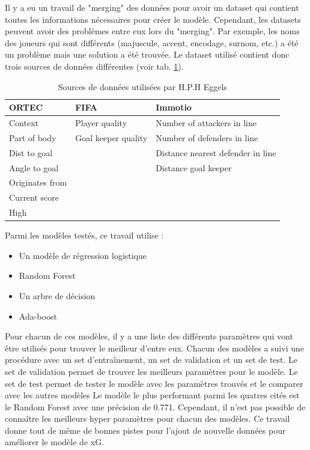 \documentclass[12pt]{article}
\begin{document}
Il y a eu un travail de "merging" des données pour avoir un dataset qui contient toutes les informations nécessaires pour créer le modèle. 
Cependant, les datasets peuvent avoir des problèmes entre eux lors du "merging". 
Par exemple, les noms des joueurs qui sont différents (majuscule, accent, encodage, surnom, etc.) a été un problème mais une solution a été trouvée.
\newline
Le dataset utilisé contient donc trois sources de données différentes (voir tab. \ref{tab:data_from_eggels}).
\begin{table}[htp]
    \centering
    \begin{tabular}{lll}
    \hline
    \textbf{ORTEC}  & \textbf{FIFA}       & \textbf{Immotio}                  \\ \hline
    Context         & Player quality      & Number of attackers in line       \\
    Part of body    & Goal keeper quality & Number of defenders in line       \\
    Dist to goal    &                     & Distance nearest defender in line \\
    Angle to goal   &                     & Distance goal keeper              \\
    Originates from &                     &                                   \\
    Current score   &                     &                                   \\
    High            &                     &                                   \\ \hline
    \end{tabular}
    \caption{Sources de données utilisées par H.P.H Eggels}
    \label{tab:data_from_eggels}
\end{table}
\newpage
Parmi les modèles testés, ce travail utilise :
\begin{itemize}
    \item Un modèle de régression logistique
    \item Random Forest
    \item Un arbre de décision
    \item Ada-boost
\end{itemize}
Pour chacun de ces modèles, il y a une liste des différents paramètres qui vont être utilisés pour trouver le meilleur d'entre eux.
Chacun des modèles a suivi une procédure avec un set d'entraînement, un set de validation et un set de test.
Le set de validation permet de trouver les meilleurs paramètres pour le modèle.
Le set de test permet de tester le modèle avec les paramètres trouvés et le comparer avec les autres modèles
Le modèle le plus performant parmi les quatres cités est le Random Forest avec une précision de 0.771.
Cependant, il n'est pas possible de connaître les meilleurs hyper paramètres pour chacun des modèles.
Ce travail donne tout de même de bonnes pistes pour l'ajout de nouvelle données pour améliorer le modèle de xG.
\newpage
\end{document}
